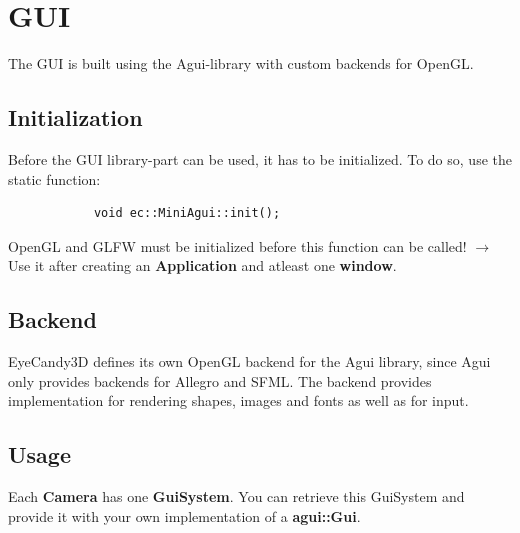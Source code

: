 \documentclass[12p, paper=a4, leqno, colorinlistoftodos]{article}
\begin{document}
	\pagebreak
	\section{GUI}
	The GUI is built using the Agui-library with custom backends for OpenGL.
	
		\subsection{Initialization}
		Before the GUI library-part can be used, it has to be initialized. To do so, use the static function:
		\begin{lstlisting}
			void ec::MiniAgui::init();
		\end{lstlisting}
		OpenGL and GLFW must be initialized before this function can be called!
		$\rightarrow$ Use it after creating an \textbf{Application} and atleast one \textbf{window}.
		
		\subsection{Backend}
			EyeCandy3D defines its own OpenGL backend for the Agui library, since Agui only provides backends for Allegro and SFML. The backend provides implementation for rendering shapes, images and fonts as well as for input.
		
		\subsection{Usage}
			Each \textbf{Camera} has one \textbf{GuiSystem}. You can retrieve this GuiSystem and provide it with your own implementation of a \textbf{agui::Gui}.
			
		
	\pagebreak
	
	
	
	
	
	
\end{document}
